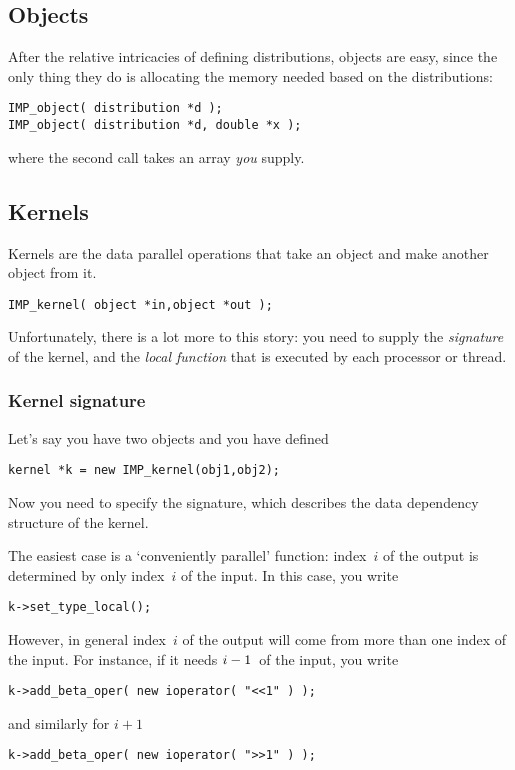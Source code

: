 \documentclass[11pt,fleqn,preprint]{impreport}
\begin{document}
\subsection{Objects}

After the relative intricacies of defining distributions, objects are easy,
since the only thing they do is allocating the memory needed based on the
distributions:
\begin{verbatim}
IMP_object( distribution *d );
IMP_object( distribution *d, double *x );
\end{verbatim}
where the second call takes an array \emph{you} supply.

\subsection{Kernels}

Kernels are the data parallel operations that take an object
and make another object from it.
\begin{verbatim}
IMP_kernel( object *in,object *out );
\end{verbatim}
Unfortunately, there is a lot more to this story: you need to supply the
\emph{signature} of the kernel, and the \emph{local function} that is executed
by each processor or thread.

\subsubsection{Kernel signature}

Let's say you have two objects  and you have defined
\begin{verbatim}
kernel *k = new IMP_kernel(obj1,obj2);
\end{verbatim}
Now you need to specify the signature, which describes the data dependency
structure of the kernel.

The easiest case is a `conveniently parallel' function: index~$i$ of the output
is determined by only index~$i$ of the input. In this case, you write
\begin{verbatim}
k->set_type_local();
\end{verbatim}
However, in general index~$i$ of the output will come from more than one
index of the input. For instance, if it needs $i-\nobreak1$~of the input,
you write
\begin{verbatim}
k->add_beta_oper( new ioperator( "<<1" ) );
\end{verbatim}
and similarly for $i+1$
\begin{verbatim}
k->add_beta_oper( new ioperator( ">>1" ) );
\end{verbatim}
\end{document}
